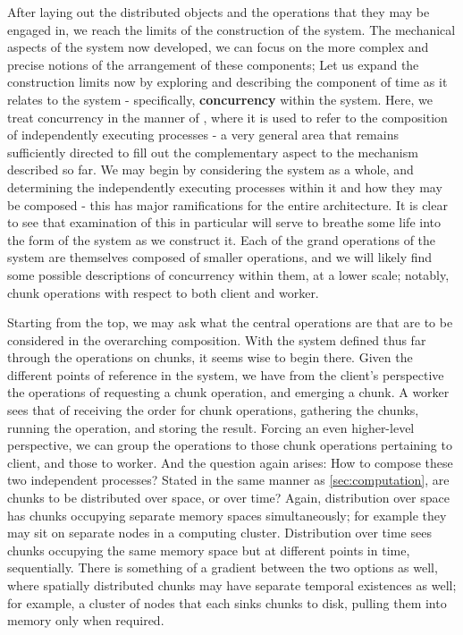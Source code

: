 After laying out the distributed objects and the operations that they may be engaged in, we reach the limits of the construction of the system.
The mechanical aspects of the system now developed, we can focus on the more complex and precise notions of the arrangement of these components; Let us expand the construction limits now by exploring and describing the component of time as it relates to the system - specifically, \textbf{concurrency} within the system.
Here, we treat concurrency in the manner of \textcite{pike2012concurrency}, where it is used to refer to the composition of independently executing processes - a very general area that remains sufficiently directed to fill out the complementary aspect to the mechanism described so far.
We may begin by considering the system as a whole, and determining the independently executing processes within it and how they may be composed - this has major ramifications for the entire architecture.
It is clear to see that examination of this in particular will serve to breathe some life into the form of the system as we construct it.
Each of the grand operations of the system are themselves composed of smaller operations, and we will likely find some possible descriptions of concurrency within them, at a lower scale; notably, chunk operations with respect to both client and worker.

Starting from the top, we may ask what the central operations are that are to be considered in the overarching composition.
With the system defined thus far through the operations on chunks, it seems wise to begin there.
Given the different points of reference in the system, we have from the client's perspective the operations of requesting a chunk operation, and emerging a chunk.
A worker sees that of receiving the order for chunk operations, gathering the chunks, running the operation, and storing the result.
Forcing an even higher-level perspective, we can group the operations to those chunk operations pertaining to client, and those to worker.
And the question again arises: How to compose these two independent processes?
Stated in the same manner as \cref{sec:computation}, are chunks to be distributed over space, or over time?
Again, distribution over space has chunks occupying separate memory spaces simultaneously; for example they may sit on separate nodes in a computing cluster.
Distribution over time sees chunks occupying the same memory space but at different points in time, sequentially.
There is something of a gradient between the two options as well, where spatially distributed chunks may have separate temporal existences as well; for example, a cluster of nodes that each sinks chunks to disk, pulling them into memory only when required.

